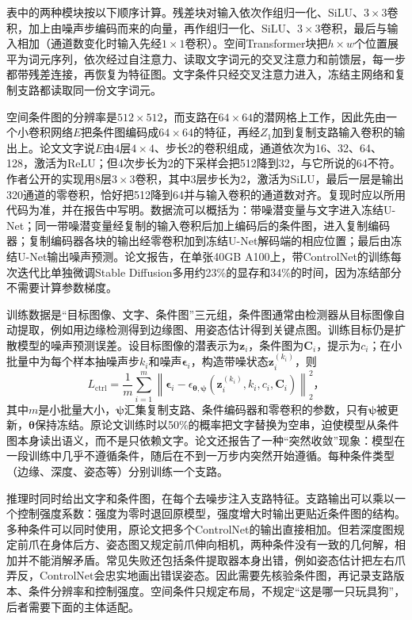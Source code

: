 表中的两种模块按以下顺序计算。残差块对输入依次作组归一化、SiLU、$3\times3$卷积，加上由噪声步编码而来的向量，再作组归一化、SiLU、$3\times3$卷积，最后与输入相加（通道数变化时输入先经$1\times1$卷积）。空间Transformer块把$h\times w$个位置展平为词元序列，依次经过自注意力、读取文字词元的交叉注意力和前馈层，每一步都带残差连接，再恢复为特征图。文字条件只经交叉注意力进入，冻结主网络和复制支路都读取同一份文字词元。

空间条件图的分辨率是$512\times512$，而支路在$64\times64$的潜网格上工作，因此先由一个小卷积网络$E$把条件图编码成$64\times64$的特征，再经$Z_1$加到复制支路输入卷积的输出上。论文文字说$E$由4层$4\times4$、步长2的卷积组成，通道依次为16、32、64、128，激活为ReLU；但4次步长为2的下采样会把512降到32，与它所说的64不符。作者公开的实现用8层$3\times3$卷积，其中3层步长为2，激活为SiLU，最后一层是输出320通道的零卷积，恰好把512降到64并与输入卷积的通道数对齐。复现时应以所用代码为准，并在报告中写明。数据流可以概括为：带噪潜变量与文字进入冻结U-Net；同一带噪潜变量经复制的输入卷积后加上编码后的条件图，进入复制编码器；复制编码器各块的输出经零卷积加到冻结U-Net解码端的相应位置；最后由冻结U-Net输出噪声预测。论文报告，在单张40GB A100上，带ControlNet的训练每次迭代比单独微调Stable Diffusion多用约23\%的显存和34\%的时间，因为冻结部分不需要计算参数梯度。

训练数据是“目标图像、文字、条件图”三元组，条件图通常由检测器从目标图像自动提取，例如用边缘检测得到边缘图、用姿态估计得到关键点图。训练目标仍是扩散模型的噪声预测误差。设目标图像的潜表示为$\bm{z}_i$，条件图为$\bm{C}_i$，提示为$c_i$；在小批量中为每个样本抽噪声步$k_i$和噪声$\bm{\epsilon}_i$，构造带噪状态$\bm{z}_i^{(k_i)}$，则
\begin{equation}
 L_{\mathrm{ctrl}}=
 \frac{1}{m}\sum_{i=1}^{m}
 \left\lVert\bm{\epsilon}_i-
 \epsilon_{\bm{\theta},\bm{\psi}}
  (\bm{z}_i^{(k_i)},k_i,c_i,\bm{C}_i)
 \right\rVert_2^2\text{，}
 \label{eq:vision-controlnet-training}
\end{equation}
其中$m$是小批量大小，$\bm{\psi}$汇集复制支路、条件编码器和零卷积的参数，只有$\bm{\psi}$被更新，$\bm{\theta}$保持冻结。原论文训练时以50\%的概率把文字替换为空串，迫使模型从条件图本身读出语义，而不是只依赖文字。论文还报告了一种“突然收敛”现象：模型在一段训练中几乎不遵循条件，随后在不到一万步内突然开始遵循。每种条件类型（边缘、深度、姿态等）分别训练一个支路。

推理时同时给出文字和条件图，在每个去噪步注入支路特征。支路输出可以乘以一个控制强度系数：强度为零时退回原模型，强度增大时输出更贴近条件图的结构。多种条件可以同时使用，原论文把多个ControlNet的输出直接相加。但若深度图规定前爪在身体后方、姿态图又规定前爪伸向相机，两种条件没有一致的几何解，相加并不能消解矛盾。常见失败还包括条件提取器本身出错，例如姿态估计把左右爪弄反，ControlNet会忠实地画出错误姿态。因此需要先核验条件图，再记录支路版本、条件分辨率和控制强度。空间条件只规定布局，不规定“这是哪一只玩具狗”，后者需要下面的主体适配。

